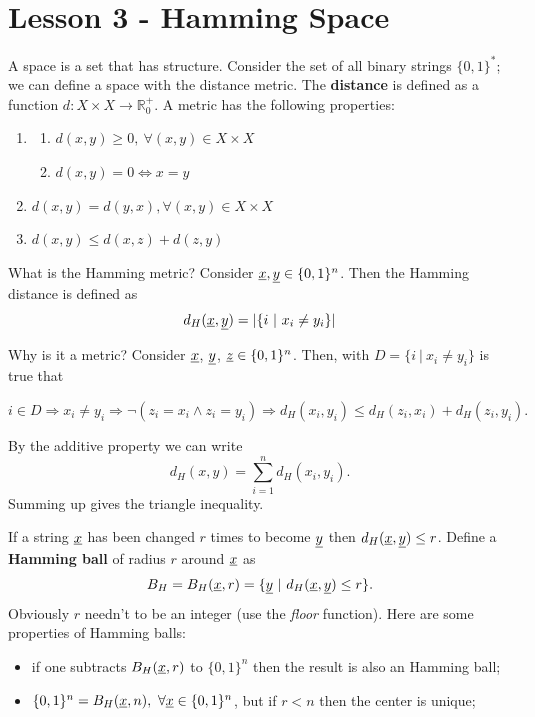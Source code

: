 \section{Lesson 3 - Hamming Space}

A space is a set that has structure. Consider the set of all binary strings $\{0, 1\}^*$; we can define a space with the distance metric. The \textbf{distance} is defined as a function $d: X \times X \rightarrow \mathbb{R}^+_0$. A metric has the following properties:
\begin{enumerate}
	\item \begin{enumerate}
		\item $d(x, y) \geq 0,\ \forall (x, y) \in X \times X$
		\item $d(x, y) = 0 \Leftrightarrow x = y$
	\end{enumerate}
	\item $d(x, y) = d(y, x), \forall (x, y) \in X \times X$
	\item $d(x, y) \leq d(x, z) + d(z, y)$
\end{enumerate}

What is the Hamming metric? Consider $\underline{x}, \underline{y}  \in \{0, 1\}^n$. Then the Hamming distance is defined as
\begin{equation}
	d_H(\underline{x}, \underline{y}) = |\{i\ |\ x_i \not= y_i\}|
\end{equation}

Why is it a metric? Consider $\underline{x}$, $\underline{y}$, $\underline{z} \in \{0,1\}^n$. Then, with $D = \{i\ |\ x_i \not= y_i\}$ is true that 
\begin{center}
	\begin{math}i \in D \Rightarrow x_i \not=y_i \Rightarrow \neg (z_i = x_i \wedge z_i = y_i) \Rightarrow d_H(x_i, y_i) \leq d_H(z_i, x_i) + d_H(z_i, y_i).
	\end{math}
\end{center}

By the additive property we can write $$d_H(x, y) = \sum_{i = 1}^n d_H(x_i, y_i).$$ Summing up gives the triangle inequality.

If a string $\underline{x}$ has been changed $r$ times to become $\underline{y}$ then $d_H(\underline{x}, \underline{y}) \leq r$. Define a \textbf{Hamming ball} of radius $r$ around $\underline{x}$ as 
$$B_H= B_H(\underline{x}, r) = \{\underline{y}\ |\ d_H(\underline{x}, \underline{y}) \leq r\}.$$
Obviously $r$ needn't to be an integer (use the \emph{floor} function). Here are some properties of Hamming balls:
\begin{itemize}
	\item if one subtracts $B_H(\underline{x}, r)$ to $\{0, 1\}^n$ then the result is also an Hamming ball;
	\item $\{0, 1\}^n = B_H(\underline{x}, n),\ \forall \underline{x} \in \{0, 1\}^n$, but if $r < n$ then the center is unique;
\end{itemize}

